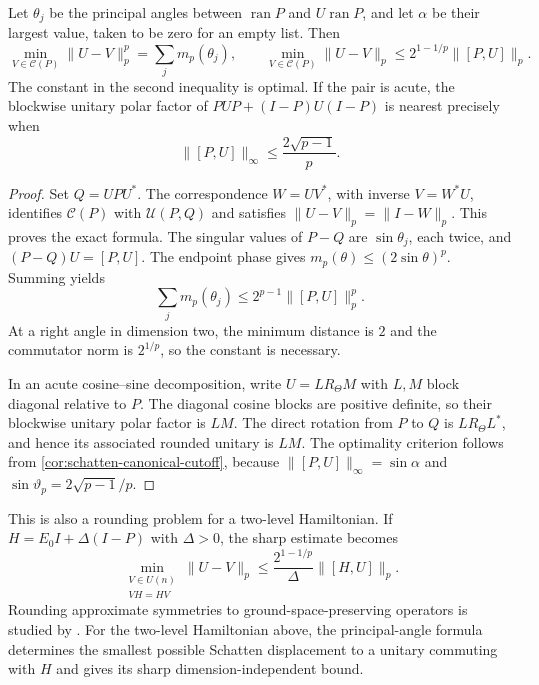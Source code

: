 \begin{corollary}
\label{cor:schatten-unitary-rounding}
Let $\theta_j$ be the principal angles between $\operatorname{ran}P$
and $U\operatorname{ran}P$, and let $\alpha$ be their largest value,
taken to be zero for an empty list. Then
\begin{equation}
 \min_{V\in\mathcal C(P)}\|U-V\|_p^p=\sum_j m_p(\theta_j),\qquad
 \min_{V\in\mathcal C(P)}\|U-V\|_p
          \leq2^{1-1/p}\|[P,U]\|_p.
 \label{eq:schatten-unitary-rounding}
\end{equation}
The constant in the second inequality is optimal. If the pair is acute,
the blockwise unitary polar factor of
$PUP+(I-P)U(I-P)$ is nearest precisely when
\begin{equation}
 \|[P,U]\|_\infty\leq\frac{2\sqrt{p-1}}{p}.
 \label{eq:schatten-polar-rounding-cutoff}
\end{equation}
\end{corollary}

\begin{proof}
Set $Q=UPU^*$. The correspondence $W=UV^*$, with inverse $V=W^*U$,
identifies $\mathcal C(P)$ with $\mathcal U(P,Q)$ and satisfies
$\|U-V\|_p=\|I-W\|_p$. This proves the exact formula.
The singular values of $P-Q$ are $\sin\theta_j$, each twice, and
$(P-Q)U=[P,U]$. The endpoint phase gives
$m_p(\theta)\leq(2\sin\theta)^p$. Summing yields
\[
 \sum_j m_p(\theta_j)\leq2^{p-1}\|[P,U]\|_p^p.
\]
At a right angle in dimension two, the minimum distance is $2$ and
the commutator norm is $2^{1/p}$, so the constant is necessary.

In an acute cosine--sine decomposition, write $U=L R_\Theta M$ with
$L,M$ block diagonal relative to $P$. The diagonal cosine blocks are
positive definite, so their blockwise unitary polar factor is $LM$.
The direct rotation from $P$ to $Q$ is $L R_\Theta L^*$, and hence its
associated rounded unitary is $LM$. The optimality criterion follows
from \cref{cor:schatten-canonical-cutoff}, because
$\|[P,U]\|_\infty=\sin\alpha$ and
$\sin\vartheta_p=2\sqrt{p-1}/p$.
\end{proof}

This is also a rounding problem for a two-level Hamiltonian. If
$H=E_0I+\Delta(I-P)$ with $\Delta>0$, the sharp estimate becomes
\[
 \min_{\substack{V\in U(n)\\VH=HV}}\|U-V\|_p
       \leq\frac{2^{1-1/p}}{\Delta}\|[H,U]\|_p.
\]
Rounding approximate symmetries to ground-space-preserving operators is
studied by \citet{chubb2017approximate}. For the two-level Hamiltonian
above, the principal-angle formula determines the smallest possible
Schatten displacement to a unitary commuting with $H$ and gives its sharp
dimension-independent bound.

